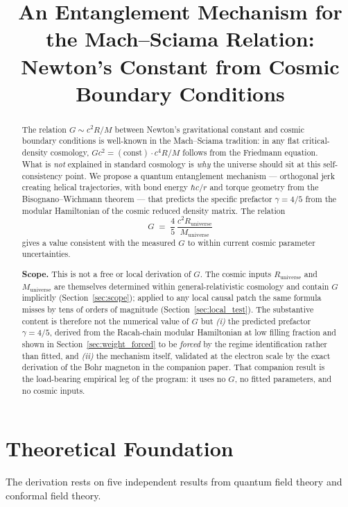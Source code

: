 \documentclass[11pt,letterpaper]{article}
\title{An Entanglement Mechanism for the Mach--Sciama Relation:\\
Newton's Constant from Cosmic Boundary Conditions}
\author{}
\date{}
\newcommand{\Runiv}{R_{\mathrm{universe}}}
\newcommand{\Muniv}{M_{\mathrm{universe}}}
\begin{document}
\maketitle

\begin{abstract}
The relation $G \sim c^2 R/M$ between Newton's gravitational constant and
cosmic boundary conditions is well-known in the Mach--Sciama tradition: in
any flat critical-density cosmology, $G c^2 = (\text{const}) \cdot c^4 R/M$
follows from the Friedmann equation. What is \emph{not} explained in standard
cosmology is \emph{why} the universe should sit at this self-consistency point.
We propose a quantum entanglement mechanism --- orthogonal jerk creating
helical trajectories, with bond energy $\hbar c/r$ and torque geometry from
the Bisognano--Wichmann theorem --- that predicts the specific prefactor
$\gamma = 4/5$ from the modular Hamiltonian of the cosmic reduced density
matrix. The relation
\begin{equation}
  G \;=\; \frac{4}{5}\,\frac{c^2 \Runiv}{\Muniv}
\end{equation}
gives a value consistent with the measured $G$ to within current cosmic
parameter uncertainties.

\textbf{Scope.} This is not a free or local derivation of $G$. The
cosmic inputs $\Runiv$ and $\Muniv$ are themselves determined within
general-relativistic cosmology and contain $G$ implicitly
(Section~\ref{sec:scope}); applied to any local causal patch the
same formula misses by tens of orders of magnitude
(Section~\ref{sec:local_test}). The substantive content is therefore
not the numerical value of $G$ but \emph{(i)} the predicted prefactor
$\gamma = 4/5$, derived from the Racah-chain modular Hamiltonian at
low filling fraction and shown in
Section~\ref{sec:weight_forced} to be \emph{forced} by the regime
identification rather than fitted, and \emph{(ii)} the mechanism
itself, validated at the electron scale by the exact derivation of
the Bohr magneton in the companion paper. That companion result is
the load-bearing empirical leg of the program: it uses no $G$, no
fitted parameters, and no cosmic inputs.
\end{abstract}

\section{Theoretical Foundation}

The derivation rests on five independent results from quantum field theory
and conformal field theory.
\end{document}
